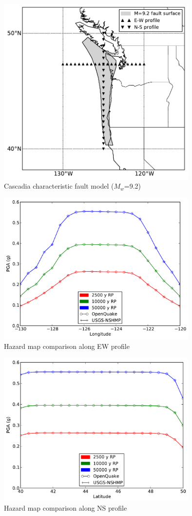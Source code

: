 \begin{figure}
\centering
\includegraphics[width=10cm]{./qareport/pictures/cascadia_char.pdf}
\caption{Cascadia characteristic fault model ($M_{w}$=9.2)}
\label{fig:cascadia_geo}
\end{figure}

\begin{figure}
\centering
\includegraphics[width=10cm]{./qareport/pictures/cascadia_char_oq_nshmp_ew.pdf}
\caption{Hazard map comparison along EW profile}
\label{fig:cascadia_char_ew}
\end{figure}
\begin{figure}
\centering
\includegraphics[width=10cm]{./qareport/pictures/cascadia_char_oq_nshmp_ns.pdf}
\caption{Hazard map comparison along NS profile}
\label{fig:cascadia_char_ns}
\end{figure}

